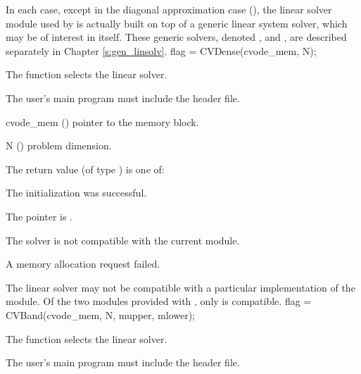 In each case, except in the diagonal approximation case ({\cvdiag}), the linear
solver module used by {\cvodes} is actually built on top of a generic
linear system solver, which may be of interest in itself.  These
generic solvers, denoted {\dense}, {\band} and {\spgmr}, are described
separately in Chapter \ref{s:gen_linsolv}.
{
  flag = CVDense(cvode\_mem, N);
}
{
  The function  selects the {\cvdense} linear solver. 

  The user's main program must include the  header file.
}
{
  \begin{args}
  \item[cvode\_mem] ()
    pointer to the {\cvodes} memory block.
  \item[N] ()
    problem dimension.
  \end{args}
}
{
  The return value  (of type ) is one of:
  \begin{args}
  \item[\Id{CVDENSE\_SUCCESS}] 
    The {\cvdense} initialization was successful.
  \item[\Id{CVDENSE\_MEM\_NULL}]
    The  pointer is .
  \item[\Id{CVDENSE\_ILL\_INPUT}]
    The {\cvdense} solver is not compatible with the current {\nvector} module.
  \item[\Id{CVDENSE\_MEM\_FAIL}]
    A memory allocation request failed.
  \end{args}
}
{
  The {\cvdense} linear solver may not be compatible with a particular
  implementation of the {\nvector} module. 
  Of the two {\nvector} modules provided with {\sundials}, only {\nvecs} is 
  compatible.
}
{
  flag = CVBand(cvode\_mem, N, mupper, mlower);
}
{
  The function  selects the {\cvband} linear solver. 

  The user's main program must include the  header file.
}
